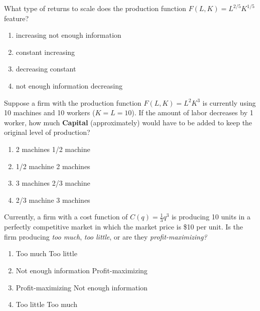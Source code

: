 \begin{question}[type=exam]{3}
  What type of returns to scale does the production function
  $F(L,K)=L^{2/5}K^{1/5}$ feature?
  \begin{enumerate}[label=\alph*), noitemsep]
    \item \vary
      {increasing}
      {not enough information}
    \item \vary
      {constant}
      {increasing}
    \item \vary
      {decreasing} %
      {constant}
    \item \vary
      {not enough information}
      {decreasing} %
  \end{enumerate}
\end{question}

\begin{question}[type=exam]{3}
  Suppose a firm with the production function
  $F(L,K)=L^{2}K^{3}$ 
  is currently using 10 machines and 10 workers ($K=L=10$).
  If the amount of labor decreases by 1 worker,
  how much \textbf{Capital} (approximately) would have to be added
  to keep the original level of production?
  \begin{enumerate}[label=\alph*), noitemsep]
    \item \vary
      {2 machines}
      {1/2 machine}
    \item \vary
      {1/2 machine}
      {2 machines}
    \item \vary
      {3 machines}
      {2/3 machine} %
    \item \vary
      {2/3 machine} %
      {3 machines}
  \end{enumerate}
\end{question}

\begin{question}[type=exam]{3}
  Currently, a firm with a cost function of $C(q)=\frac{1}{3}q^3$
  is producing 10 units in a perfectly competitive market
  in which the market price is \$10 per unit.
  Is the firm producing \textit{too much}, \textit{too little},
  or are they \textit{profit-maximizing?}
  \begin{enumerate}[label=\alph*), noitemsep]
    \item \vary
      {Too much} %
      {Too little}
    \item \vary
      {Not enough information}
      {Profit-maximizing} 
    \item \vary
      {Profit-maximizing}
      {Not enough information}
    \item \vary
      {Too little}
      {Too much} %
  \end{enumerate}
\end{question}

